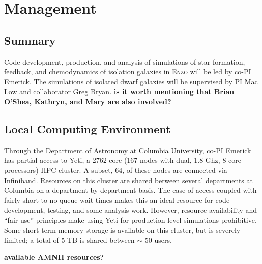 \documentclass[11pt]{article}
\begin{document}
\section{Management}

\subsection{Summary}

Code development, production, and analysis of simulations of star formation, feedback, and chemodynamics of isolation galaxies in \textsc{Enzo} will be led by co-PI Emerick. The simulations of isolated dwarf galaxies will be supervised by PI Mac Low and collaborator Greg Bryan. {\bf is it worth mentioning that Brian O'Shea, Kathryn, and Mary are also involved?}

\subsection{Local Computing Environment}

Through the Department of Astronomy at Columbia University, co-PI Emerick has partial access to Yeti, a 2762 core (167 nodes with dual, 1.8 Ghz, 8 core processors) HPC cluster. A subset, 64, of these nodes are connected via Infiniband. Resources on this cluster are shared between several departments at Columbia on a department-by-department basis. The ease of access coupled with fairly short to no queue wait times makes this an ideal resource for code development, testing, and some analysis work. However, resource availability and ``fair-use'' principles make using Yeti for production level simulations prohibitive. Some short term memory storage is available on this cluster, but is severely limited; a total of 5 TB is shared between $\sim$ 50 users.

{\bf available AMNH resources?}




\end{document}
